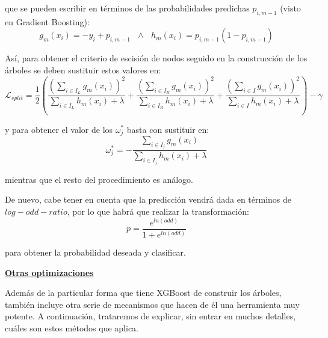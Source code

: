 \documentclass[12pt,twoside]{article}
\begin{document}
\noindent
que se pueden escribir en términos de las probabilidades predichas $p_{i, m-1}$ (visto en Gradient Boosting):
\begin{equation*}
g_m(x_i) = -y_i + p_{i, m-1} \, \, \, \, \wedge \, \, \, \, h_m(x_i) = p_{i, m-1}(1 - p_{i, m-1})
\end{equation*}

Así, para obtener el criterio de escisión de nodos seguido en la construcción de los árboles se deben sustituir estos valores en:
\begin{equation*}
\mathcal{L}_{split} = \frac{1}{2} \left( \frac{\left( \sum_{i \in I_L} g_m(x_i) \right)^2}{\sum_{i \in I_L} h_m(x_i) + \lambda} + \frac{\left( \sum_{i \in I_R} g_m(x_i) \right)^2}{\sum_{i \in I_R} h_m(x_i) + \lambda} + \frac{\left( \sum_{i \in I} g_m(x_i) \right)^2}{\sum_{i \in I} h_m(x_i) + \lambda} \right)   - \gamma 
\end{equation*}

\noindent
y para obtener el valor de los $\omega_j^*$ basta con sustituir en:
\begin{equation*}
\omega_j^* = - \frac{\sum_{i \in I_j} g_m(x_i)}{\sum_{i \in I_j} h_m(x_i) + \lambda}
\end{equation*}

\noindent
mientras que el resto del procedimiento es análogo.

De nuevo, cabe tener en cuenta que la predicción vendrá dada en términos de $log-odd-ratio$, por lo que habrá que realizar la transformación:
\begin{equation*}
p = \frac{e^{ln(odd)}}{1 + e^{ln(odd)}}
\end{equation*}

\noindent
para obtener la probabilidad deseada y clasificar.



\bigskip \bigskip \bigskip

\textbf{\underline{Otras optimizaciones}}

Además de la particular forma que tiene XGBoost de construir los árboles, también incluye otra serie de mecanismos que hacen de él una herramienta muy potente. A continuación, trataremos de explicar, sin entrar en muchos detalles, cuáles son estos métodos que aplica.
\end{document}
